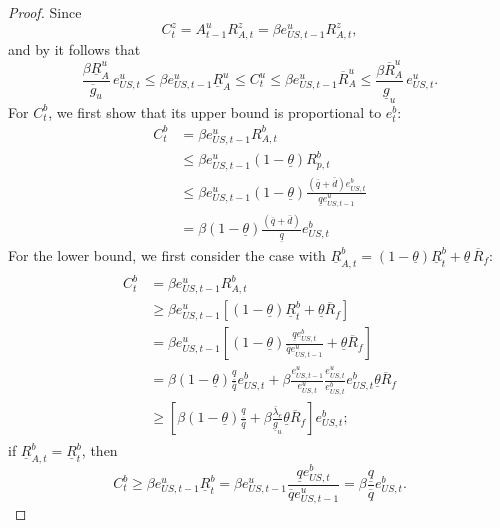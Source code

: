 \documentclass[12pt]{article}
\theoremstyle{plain}
\begin{document}
\begin{proof}
Since
\[
C_t^z=A_{t-1}^uR_{A,t}^z=\beta e_{US,t-1}^uR_{A,t}^z,
\]
and by  it follows that
\[
\frac{\beta\underline R^u_A}{\overline g_u}\,e_{US,t}^u
\le 
\beta e_{US,t-1}^u\underline R^u_A
\le
C_t^u
\le
\beta e_{US,t-1}^u\overline R^u_A
\le
\frac{\beta\overline R^u_A}{\underline g_u}\,e_{US,t}^u.
\]
For $C^b_t$, we first show that its upper bound is proportional to $e^b_t$:
\begin{align*}
    C^b_t 
    &=
    \beta e^u_{US,t-1} R^b_{A,t}
    \\& \le
    \beta e^u_{US,t-1}(1-\underline{\theta}) R^b_{p,t}
    \\& \le
    \beta e^u_{US,t-1}(1-\underline{\theta})\frac{(\bar q+\bar d)e^b_{US,t}}{\underline{q} e^u_{US,t-1}}
    \\&=
     \beta(1-\underline{\theta})\frac{(\bar q+\bar d)}{\underline{q}}e^b_{US,t}
\end{align*}
For the lower bound, we first consider the case with $\underline R^b_{A,t}=(1-\underline\theta)\underline R^b_t+\underline\theta\,\overline R_f$:
\begin{align*}
\begin{split}
		{C^b_t}
    &={\beta e^u_{US,t-1}R^b_{A,t}}
    \\& \geq{\beta e^u_{US,t-1}} \left[(1-\underline{\theta} )\underline{R}^b_t
    + \underline{\theta} \overline{R}_f  \right] 
     \\& ={\beta e^u_{US,t-1}} \left[(1-\underline{\theta} )\frac{\underline{q} e^b_{US,t}}{\overline{q}e^u_{US,t-1}}+ \underline{\theta} \overline{R}_f  \right]
      \\&=\beta(1-\underline{\theta} )\frac{\underline{q} }{\overline{q}}e^b_{US,t}
      + \beta \frac{e^u_{US,t-1}}{e^u_{US,t}} \frac{e^u_{US,t}}{e^b_{US,t}} e^b_{US,t}\underline{\theta} \overline{R}_f  
      \\& \geq \left[\beta(1-\underline{\theta} )\frac{\underline{q} }{\overline{q}}
      + \beta \frac{\bar \lambda_e}{\underline{g}_u} \underline{\theta} \overline{R}_f  \right] e^b_{US,t};
\end{split}
\end{align*}
if $\underline R^b_{A,t}=\underline R^b_t$, then
\[
		C^b_t
 		\geq{\beta e^u_{US,t-1}} \underline{R}^b_t
     ={\beta e^u_{US,t-1}} \frac{\underline{q} e^b_{US,t}}{\overline{q}e^u_{US,t-1}}
      =\beta\frac{\underline{q} }{\overline{q}}e^b_{US,t}.
\]


\end{proof}
\end{document}
